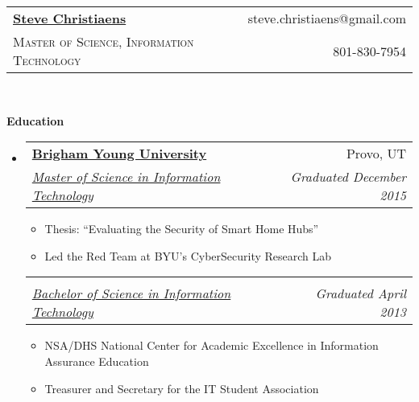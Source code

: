 \documentclass[letterpaper,11pt]{article}
\makeatletter
\newcommand{\resitem}[1]{\item #1 \vspace{-2pt}}
\newcommand{\resheading}[1]{{\large \colorbox{mygrey}{\begin{minipage}{\textwidth}{\textbf{#1 \vphantom{p\^{E}}}}\end{minipage}}}}
\newcommand{\ressubheading}[4]{
\begin{tabular*}{6.5in}{l@{\extracolsep{\fill}}r}
		\textbf{#1} & #2 \\
		\textit{#3} & \textit{#4} \\
\end{tabular*}\vspace{-6pt}}
\makeatother
\begin{document}
\newcommand{\mywebheader}{
\begin{tabular*}{7in}{l@{\extracolsep{\fill}}r}
	\textbf{\href{}{\LARGE Steve Christiaens}} & %
	{steve.christiaens@gmail.com}\\
	{\footnotesize \textsc{Master of Science, Information Technology}} & {801-830-7954} \\
	\end{tabular*}
\\
\vspace{0.1in}}

\mywebheader
\begin{comment}
	Consider adding a "QUALIFICATIONS" sections
\end{comment}
\resheading{Education}
	\begin{itemize}
		\item
			\ressubheading{\href{}{Brigham Young University}}{Provo, UT}{\href{}{Master of Science in Information Technology} \href{}{}}{Graduated December 2015}
			{ \footnotesize
				\begin{itemize}
					\resitem{Thesis: ``Evaluating the Security of Smart Home Hubs''}
					\resitem{Led the Red Team at BYU's CyberSecurity Research Lab} 
				\end{itemize}
			}				
			\vspace{-15pt} %
			\ressubheading{\href{}{}}{}{\href{}{Bachelor of Science in Information Technology}\href{}{}}{Graduated April 2013}
				{ \footnotesize
					\begin{itemize}
						\resitem{NSA/DHS National Center for Academic Excellence in Information Assurance Education}
						\resitem{Treasurer and Secretary for the IT Student Association} 
					\end{itemize}
				}
	\end{itemize} %
\end{document}
